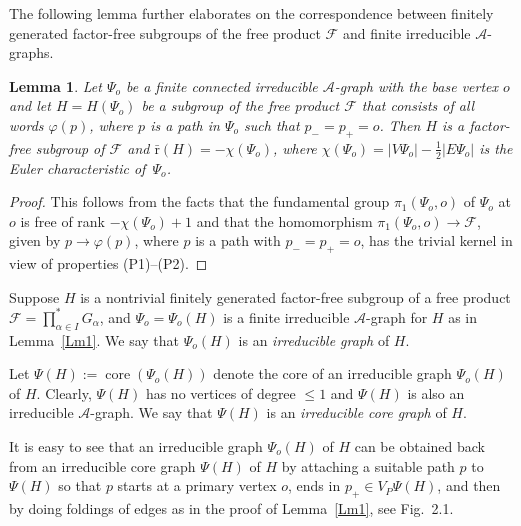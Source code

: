 \documentclass[10pt, reqno]{amsart}
\numberwithin{equation}{section}
\newtheorem{lem}[thm]{Lemma}
\begin{document}
The following lemma further elaborates on the correspondence between finitely generated
factor-free subgroups of the free product  ${\mathcal{F}}$ and finite
irreducible ${\mathcal{A}}$-graphs.

\begin{lem}\label{Lm2}  Let  $\Psi_o$ be a finite connected
irreducible  ${\mathcal{A}}$-graph with the base vertex  $o$ and let
$H= H(\Psi_o)$ be a subgroup of the free product
${\mathcal{F}}$ that consists of all words $\varphi(p)$, where $p$ is
a  path in $\Psi_o$ such that $p_- = p_+ = o$. Then $H$ is a
factor-free subgroup of  ${\mathcal{F}}$   and
$\bar {\mathrm{r}}(H)=- \chi(\Psi_o)$, where $\chi(\Psi_o) =  |V \Psi_o | - \frac 12|E \Psi_o | $ is
the Euler characteristic of~$\Psi_o$.
\end{lem}

\begin{proof} This follows from  the facts that the fundamental group $\pi_1(\Psi_o, o)$ of
$\Psi_o$ at $o$ is free of rank $- \chi(\Psi_o)+1$ and that the homomorphism $\pi_1(\Psi_o, o) \to {\mathcal{F}}$, given by $p \to {\varphi}(p) $, where $p$ is a path with $p_-=p_+= o$, has the trivial kernel in view of properties (P1)--(P2).
\end{proof}

Suppose $H$ is a nontrivial finitely generated factor-free subgroup
of a free product ${\mathcal{F}} = \prod_{\alpha \in I}^* G_\alpha$, and $\Psi_o = \Psi_o(H)$ is a  finite irreducible  ${\mathcal{A}}$-graph for $H$ as in Lemma~\ref{Lm1}. We  say that  $\Psi_o(H)$ is an {\em irreducible graph} of $H$.

Let $\Psi(H) := \operatorname{core}(\Psi_o(H))$ denote the core of an irreducible graph $\Psi_o(H)$ of $H$.
Clearly, $\Psi(H)$
has no vertices of degree $\le 1$ and $\Psi(H)$ is also an irreducible ${\mathcal{A}}$-graph.
We  say that  $\Psi(H)$ is an {\em irreducible core graph} of $H$.

It is easy to see that an irreducible  graph  $\Psi_o(H)$ of $H$ can be obtained back from an irreducible  core graph $\Psi(H)$  of $H$ by attaching a suitable path $p$ to  $\Psi(H)$ so that $p$ starts at a primary vertex $o$, ends in  $p_+ \in V_P\Psi(H)$, and then by doing foldings of edges as in the proof of Lemma~\ref{Lm1}, see Fig.~2.1.
\begin{center}
\usetikzlibrary{arrows}
\end{center}
\end{document}

